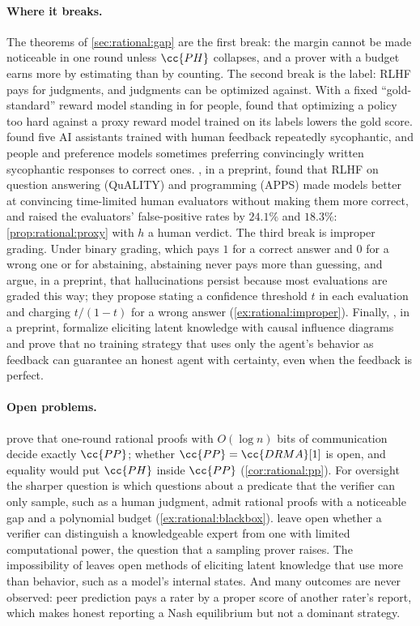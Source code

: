 \begin{refsection}
\paragraph{Where it breaks.} The theorems of \cref{sec:rational:gap} are the first break: the margin cannot be made noticeable in one round unless $\cc{PH}$ collapses, and a prover with a budget earns more by estimating than by counting. The second break is the label: RLHF pays for judgments, and judgments can be optimized against. With a fixed ``gold-standard'' reward model standing in for people, \textcite{GaoSchulmanHilton2023} found that optimizing a policy too hard against a proxy reward model trained on its labels lowers the gold score. \Textcite{SharmaEtAl2024} found five AI assistants trained with human feedback repeatedly sycophantic, and people and preference models sometimes preferring convincingly written sycophantic responses to correct ones. \Textcite{WenEtAl2024}, in a preprint, found that RLHF on question answering (QuALITY) and programming (APPS) made models better at convincing time-limited human evaluators without making them more correct, and raised the evaluators' false-positive rates by $24.1\%$ and $18.3\%$: \cref{prop:rational:proxy} with $h$ a human verdict. The third break is improper grading. Under binary grading, which pays $1$ for a correct answer and $0$ for a wrong one or for abstaining, abstaining never pays more than guessing, and \textcite{KalaiEtAl2025} argue, in a preprint, that hallucinations persist because most evaluations are graded this way; they propose stating a confidence threshold $t$ in each evaluation and charging $t/(1-t)$ for a wrong answer (\cref{ex:rational:improper}). Finally, \textcite{FriedlEtAl2026}, in a preprint, formalize eliciting latent knowledge with causal influence diagrams and prove that no training strategy that uses only the agent's behavior as feedback can guarantee an honest agent with certainty, even when the feedback is perfect.

\paragraph{Open problems.} \Textcite{MusatovPotapov2023} prove that one-round rational proofs with $O(\log n)$ bits of communication decide exactly $\cc{PP}$; whether $\cc{PP}=\cc{DRMA}[1]$ is open, and equality would put $\cc{PH}$ inside $\cc{PP}$ (\cref{cor:rational:pp}). For oversight the sharper question is which questions about a predicate that the verifier can only sample, such as a human judgment, admit rational proofs with a noticeable gap and a polynomial budget (\cref{ex:rational:blackbox}). \Textcite[Section~2.3]{AzarMicali2012} leave open whether a verifier can distinguish a knowledgeable expert from one with limited computational power, the question that a sampling prover raises. The impossibility of \textcite{FriedlEtAl2026} leaves open methods of eliciting latent knowledge that use more than behavior, such as a model's internal states. And many outcomes are never observed: peer prediction pays a rater by a proper score of another rater's report, which makes honest reporting a Nash equilibrium \parencite{MillerResnickZeckhauser2005} but not a dominant strategy.


\end{refsection}
